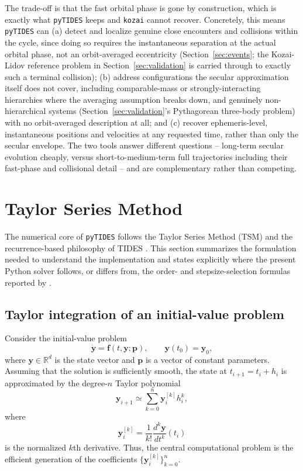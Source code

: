 \documentclass[11pt]{article}
\begin{document}
The trade-off is that the fast orbital phase is gone by construction, which
is exactly what \texttt{pyTIDES} keeps and \texttt{kozai} cannot recover.
Concretely, this means \texttt{pyTIDES} can (a) detect and localize genuine
close encounters and collisions within the cycle, since doing so requires
the instantaneous separation at the actual orbital phase, not an
orbit-averaged eccentricity (Section~\ref{sec:events}; the Kozai-Lidov
reference problem in Section~\ref{sec:validation} is carried through to
exactly such a terminal collision); (b) address configurations the secular
approximation itself does not cover, including comparable-mass or
strongly-interacting hierarchies where the averaging assumption breaks
down, and genuinely non-hierarchical systems (Section~\ref{sec:validation}'s
Pythagorean three-body problem) with no orbit-averaged description at all;
and (c) recover ephemeris-level, instantaneous positions and velocities at
any requested time, rather than only the secular envelope. The two tools
answer different questions -- long-term secular evolution cheaply, versus
short-to-medium-term full trajectories including their fast-phase and
collisional detail -- and are complementary rather than competing.


\section{Taylor Series Method}
\label{sec:taylor}

The numerical core of \texttt{pyTIDES} follows the Taylor Series Method (TSM)
and the recurrence-based philosophy of TIDES \citep{Abad2012}. This section
summarizes the formulation needed to understand the implementation and states
explicitly where the present Python solver follows, or differs from, the
order- and stepsize-selection formulas reported by \citet{Abad2012}.

\subsection{Taylor integration of an initial-value problem}

Consider the initial-value problem
\begin{equation}
    \dot{\bm y} = \bm f(t,\bm y;\bm p),
    \qquad
    \bm y(t_0)=\bm y_0,
    \label{eq:ivp}
\end{equation}
where $\bm y\in\mathbb{R}^{d}$ is the state vector and $\bm p$ is a vector of
constant parameters. Assuming that the solution is sufficiently smooth, the
state at $t_{i+1}=t_i+h_i$ is approximated by the degree-$n$ Taylor polynomial
\begin{equation}
    \bm y_{i+1}\simeq
    \sum_{k=0}^{n}\bm y_i^{[k]}h_i^k,
    \label{eq:tsm-step}
\end{equation}
where
\begin{equation}
    \bm y_i^{[k]}=
    \frac{1}{k!}\frac{d^k\bm y}{dt^k}(t_i)
    \label{eq:normalized-derivative}
\end{equation}
is the normalized $k$th derivative. Thus, the central computational problem
is the efficient generation of the coefficients
$\{\bm y_i^{[k]}\}_{k=0}^{n}$.
\end{document}
